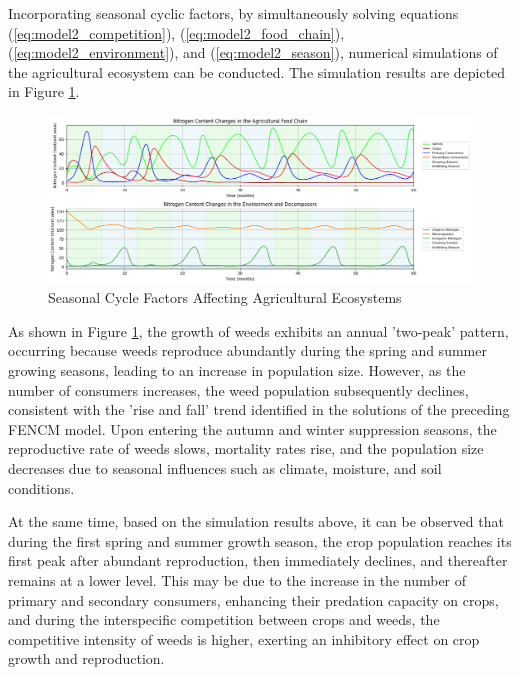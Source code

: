 \documentclass{mcmthesis}
\begin{document}
Incorporating seasonal cyclic factors, by simultaneously solving equations (\ref{eq:model2_competition}), (\ref{eq:model2_food_chain}), (\ref{eq:model2_environment}), and (\ref{eq:model2_season}), numerical simulations of the agricultural ecosystem can be conducted. The simulation results are depicted in Figure \ref{fig:model2_season}. 

\begin{figure}[h] 
\centering
\includegraphics[width=\textwidth]{figures/model2_season.png}
\setlength{\abovecaptionskip}{-0.5cm} %
\caption{Seasonal Cycle Factors Affecting Agricultural Ecosystems}
\label{fig:model2_season}
\end{figure}

As shown in Figure \ref{fig:model2_season}, the growth of weeds exhibits an annual 'two-peak' pattern, occurring because weeds reproduce abundantly during the spring and summer growing seasons, leading to an increase in population size. However, as the number of consumers increases, the weed population subsequently declines, consistent with the 'rise and fall' trend identified in the solutions of the preceding FENCM model. Upon entering the autumn and winter suppression seasons, the reproductive rate of weeds slows, mortality rates rise, and the population size decreases due to seasonal influences such as climate, moisture, and soil conditions.

At the same time, based on the simulation results above, it can be observed that during the first spring and summer growth season, the crop population reaches its first peak after abundant reproduction, then immediately declines, and thereafter remains at a lower level. This may be due to the increase in the number of primary and secondary consumers, enhancing their predation capacity on crops, and during the interspecific competition between crops and weeds, the competitive intensity of weeds is higher, exerting an inhibitory effect on crop growth and reproduction. 
\end{document}
